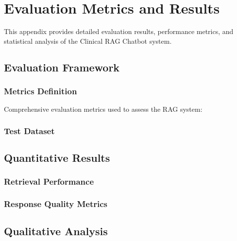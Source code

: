 \chapter{Evaluation Metrics and Results}
\label{appendix:evaluation}

This appendix provides detailed evaluation results, performance metrics, and statistical analysis of the Clinical RAG Chatbot system.

\section{Evaluation Framework}

\subsection{Metrics Definition}
Comprehensive evaluation metrics used to assess the RAG system:

\subsection{Test Dataset}

\section{Quantitative Results}

\subsection{Retrieval Performance}

\subsection{Response Quality Metrics}

\section{Qualitative Analysis}

